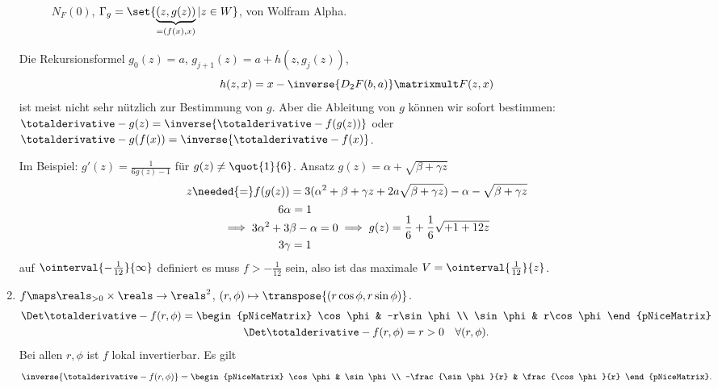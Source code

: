 \begin{beispiele}
\begin{enumerate}
\begin{figure}[H]
      \caption*{\( N_F(0) \), \textcolor{Blue}{\( \Gamma_g=\set{\underbrace{(z,g(z))}_{=(f(x),x)}|z\in W} \)}, von Wolfram Alpha.}
      \label{fig:satz_von_der_umkehrungsfunktion_beispiel_parabel_umkehrung}
    \end{figure}
    Die Rekursionsformel \( g_0(z)=a \), \( g_{j+1}(z)=a+h(z,g_j(z)) \),
    \begin{equation*}
      h(z,x)=x-\inverse{D_2 F(b,a)}\matrixmult F(z,x)
    \end{equation*}
    ist meist nicht sehr nützlich zur Bestimmung von \( g \). Aber die Ableitung von \( g \) können wir sofort bestimmen: \( \totalderivative-{g}(z)=\inverse{\totalderivative-{f}(g(z))} \) oder \( \totalderivative-{g}(f(x))=\inverse{\totalderivative-{f}(x)} \).

    Im Beispiel: \( g'(z)=\frac{1}{6g(z)-1} \) für \( g(z)\neq \quot{1}{6} \). \timplies Ansatz \( g(z)=\alpha+\sqrt{\beta+\gamma z} \)
    \begin{gather*}
      z\needed{=}f(g(z))=3(\alpha^2+\beta+\gamma z+2a\sqrt{\beta+\gamma z})-\alpha-\sqrt{\beta+\gamma z}\\
      \implies \begin{gathered}
        6\alpha = 1\\
        3\alpha^2+3\beta-\alpha=0\\
        3\gamma=1
    \end{gathered}\implies g(z)=\frac{1}{6}+\frac{1}{6}\sqrt{+1+12z}
    \end{gather*}
    auf \( \ointerval{-\frac{1}{12}}{\infty} \) definiert \timplies es muss \( f>-\frac{1}{12} \) sein, also ist das maximale \( V=\ointerval{\frac{1}{12}}{z} \).
    \item \( f\maps \reals_{>0}\times \reals\to \reals^2 \), \( (r,\phi)\mapsto \transpose{(r\cos \phi, r\sin \phi)} \).
    \begin{gather*}
      \Det \totalderivative-{f}(r,\phi)=\begin{pNiceMatrix} \cos \phi & -r\sin \phi \\ \sin \phi
       & r\cos \phi \end{pNiceMatrix}\\
       \Det \totalderivative-{f}(r,\phi)=r>0\quad \forall (r,\phi).
    \end{gather*}
    \timplies Bei allen \( r,\phi \) ist \( f \) lokal invertierbar. Es gilt
    \begin{equation*}
      \inverse{\totalderivative-{f}(r,\phi)}=\begin{pNiceMatrix} \cos \phi & \sin \phi \\ -\frac{\sin \phi}{r} & \frac{\cos \phi}{r} \end{pNiceMatrix}.

\end{equation*}
\end{enumerate}
\end{beispiele}
